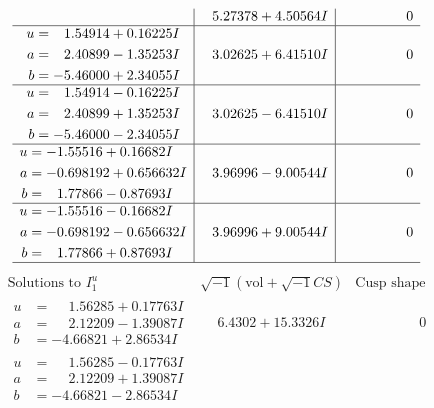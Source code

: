 \documentclass[1p]{elsarticle_modified}
\theoremstyle{definition}
\newcommand{\I}{\sqrt{-1}}
\begin{document}
$$\begin{array}{c|c|c}
 & \phantom{-}5.27378 + 4.50564 I & \phantom{-0.000000 } 0 \\ \hline\begin{aligned}
u &= \phantom{-}1.54914 + 0.16225 I \\
a &= \phantom{-}2.40899 - 1.35253 I \\
b &= -5.46000 + 2.34055 I\end{aligned}
 & \phantom{-}3.02625 + 6.41510 I & \phantom{-0.000000 } 0 \\ \hline\begin{aligned}
u &= \phantom{-}1.54914 - 0.16225 I \\
a &= \phantom{-}2.40899 + 1.35253 I \\
b &= -5.46000 - 2.34055 I\end{aligned}
 & \phantom{-}3.02625 - 6.41510 I & \phantom{-0.000000 } 0 \\ \hline\begin{aligned}
u &= -1.55516 + 0.16682 I \\
a &= -0.698192 + 0.656632 I \\
b &= \phantom{-}1.77866 - 0.87693 I\end{aligned}
 & \phantom{-}3.96996 - 9.00544 I & \phantom{-0.000000 } 0 \\ \hline\begin{aligned}
u &= -1.55516 - 0.16682 I \\
a &= -0.698192 - 0.656632 I \\
b &= \phantom{-}1.77866 + 0.87693 I\end{aligned}
 & \phantom{-}3.96996 + 9.00544 I & \phantom{-0.000000 } 0\\
 \hline 
 \end{array}$$\newpage$$\begin{array}{c|c|c}  
\text{Solutions to }I^u_{1}& \I (\text{vol} + \sqrt{-1}CS) & \text{Cusp shape}\\
 \hline 
\begin{aligned}
u &= \phantom{-}1.56285 + 0.17763 I \\
a &= \phantom{-}2.12209 - 1.39087 I \\
b &= -4.66821 + 2.86534 I\end{aligned}
 & \phantom{-}6.4302 + 15.3326 I & \phantom{-0.000000 } 0 \\ \hline\begin{aligned}
u &= \phantom{-}1.56285 - 0.17763 I \\
a &= \phantom{-}2.12209 + 1.39087 I \\
b &= -4.66821 - 2.86534 I\end{aligned}

\end{array}$$
\end{document}
